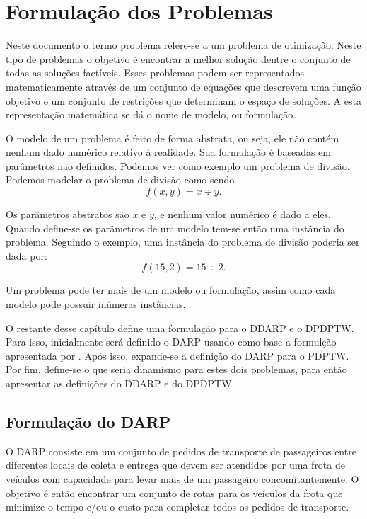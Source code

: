 \chapter{Formulação dos Problemas}\label{ch:formulacao_problemas}
Neste documento o termo problema refere-se a um problema de otimização.
Neste tipo de problemas o objetivo é encontrar a melhor solução dentre o
conjunto de todas as soluções factíveis.
Esses problemas podem ser representados matematicamente através de um conjunto
de equações que descrevem uma função objetivo e um conjunto de restrições que
determinam o espaço de soluções.
A esta representação matemática se dá o nome de modelo, ou formulação.

O modelo de um problema é feito de forma abstrata, ou seja, ele não
contém nenhum dado numérico relativo à realidade. 
Sua formulação é baseadas em parâmetros não definidos.
Podemos ver como exemplo um problema de divisão.
Podemos modelar o problema de divisão como sendo 
%
\begin{equation}
  f(x, y) = x \div y.
\end{equation}

\noindent Os parâmetros abstratos são $x$ e $y$, e nenhum valor 
numérico é dado a eles.
Quando define-se os parâmetros de um modelo tem-se então uma instância do
problema.
Seguindo o exemplo, uma instância do problema de divisão poderia ser dada por:
%
\begin{equation}
  f(15, 2) = 15 \div 2.
\end{equation}

\noindent Um problema pode ter mais de um modelo ou formulação, assim como cada
modelo pode possuir inúmeras instâncias.

O restante desse capítulo define uma formulação para o DDARP e o DPDPTW. 
Para isso, inicialmente será definido o DARP usando como base a formulção 
apresentada por \textcite{cordeau_tabu_2003}. 
Após isso, expande-se a definição do DARP para o PDPTW. 
Por fim, define-se o que seria dinamismo para estes dois problemas, para então 
apresentar as definições do DDARP e do DPDPTW.

\section{Formulação do DARP}\label{sec:formulacao_DARP}
O DARP consiste em um conjunto de pedidos de transporte de passageiros entre 
diferentes locais de coleta e entrega que devem ser atendidos por uma frota
de veículos com capacidade para levar mais de um passageiro concomitantemente. 
O objetivo é então encontrar um conjunto de rotas para os veículos da frota
que minimize o tempo e/ou o custo para completar todos os pedidos de
transporte.

